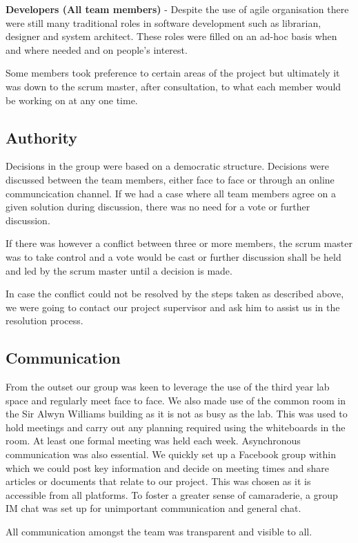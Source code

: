 \documentclass{l3proj}
\begin{document}
{\bf Developers (All team members)} - Despite the use of agile organisation there were still many traditional roles in software development such as librarian, designer and system architect.  These roles were filled on an ad-hoc basis when and where needed and on people’s interest.

Some members took preference to certain areas of the project but ultimately it was down to the scrum master, after consultation, to what each member would be working on at any one time.

\subsection{Authority}Decisions in the group were based on a democratic structure. Decisions were discussed between the team members, either face to face or through an online communcication channel. If we had a case where all team members agree on a given solution during discussion, there was no need for a vote or further discussion.

If there was however a conflict between three or more members, the scrum master was to take control and a vote would be cast or further discussion shall be held and led by the scrum master until a decision is made.

In case the conflict could not be resolved by the steps taken as described above, we were going to contact our project supervisor and ask him to assist us in the resolution process.

\subsection{Communication}		From the outset our group was keen to leverage the use of the third year lab space and regularly meet face to face. We also made use of the common room in the Sir Alwyn Williams building as it is not as busy as the lab. This was used to hold meetings and carry out any planning required using the whiteboards in the room. At least one formal meeting was held each week. Asynchronous communication was also essential. We quickly set up a Facebook group within which we could post key information and decide on meeting times and share articles or documents that relate to our project. This was chosen as it is accessible from all platforms. To foster a greater sense of camaraderie, a group IM chat was set up for unimportant communication and general chat.

All communication amongst the team was transparent and visible to all.
\end{document}
